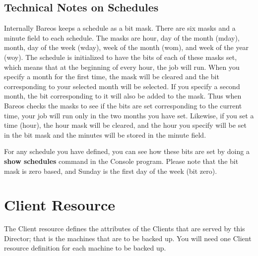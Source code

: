 \subsection{Technical Notes on Schedules}

Internally Bareos keeps a schedule as a bit mask. There are six masks and a
minute field to each schedule. The masks are hour, day of the month (mday),
month, day of the week (wday), week of the month (wom), and week of the year
(woy). The schedule is initialized to have the bits of each of these masks
set, which means that at the beginning of every hour, the job will run. When
you specify a month for the first time, the mask will be cleared and the bit
corresponding to your selected month will be selected. If you specify a second
month, the bit corresponding to it will also be added to the mask. Thus when
Bareos checks the masks to see if the bits are set corresponding to the
current time, your job will run only in the two months you have set. Likewise,
if you set a time (hour), the hour mask will be cleared, and the hour you
specify will be set in the bit mask and the minutes will be stored in the
minute field.

For any schedule you have defined, you can see how these bits are set by doing
a {\bf show schedules} command in the Console program. Please note that the
bit mask is zero based, and Sunday is the first day of the week (bit zero).



\section{Client Resource}
\label{ClientResource2}

The Client resource defines the attributes of the Clients that are served by
this Director; that is the machines that are to be backed up. You will need
one Client resource definition for each machine to be backed up.

